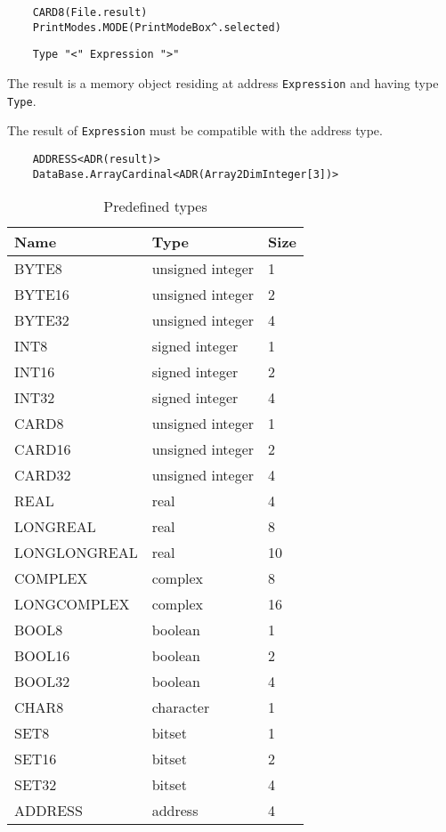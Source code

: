 \verb'    CARD8(File.result)' \\
\verb'    PrintModes.MODE(PrintModeBox^.selected)'

\verb'    Type "<" Expression ">"'

The result is a memory object residing at address \verb'Expression'
and having type \verb'Type'.

The result of \verb'Expression' must be compatible with the address type.

\verb'    ADDRESS<ADR(result)>' \\
\verb'    DataBase.ArrayCardinal<ADR(Array2DimInteger[3])>'

\begin{table}
\begin{center}
\begin{tabular}{lll}
\bf Name & \bf Type & \bf Size \\
\hline
BYTE8        & unsigned integer & 1  \\  %
BYTE16       & unsigned integer & 2  \\
BYTE32       & unsigned integer & 4  \\
INT8         & signed integer   & 1  \\
INT16        & signed integer   & 2  \\
INT32        & signed integer   & 4  \\
CARD8        & unsigned integer & 1  \\
CARD16       & unsigned integer & 2  \\
CARD32       & unsigned integer & 4  \\
REAL         & real             & 4  \\
LONGREAL     & real             & 8  \\
LONGLONGREAL & real             & 10 \\
COMPLEX      & complex          & 8  \\
LONGCOMPLEX  & complex          & 16 \\
BOOL8        & boolean          & 1  \\
BOOL16       & boolean          & 2  \\
BOOL32       & boolean          & 4  \\
CHAR8        & character        & 1  \\
SET8         & bitset           & 1 \\
SET16        & bitset           & 2 \\
SET32        & bitset           & 4 \\
ADDRESS      & address          & 4
\end{tabular}
\end{center}
\caption{Predefined types}
\end{table}

